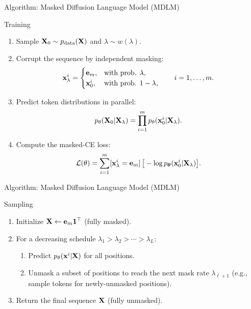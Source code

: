 \documentclass{beamer}
\begin{document}
\begin{frame}{Algorithm: Masked Diffusion Language Model (MDLM)}

	\begin{block}{Training}
		\begin{enumerate}
			\item Sample $\mathbf{X}_0 \sim p_{\text{data}}(\mathbf{X})$ and $\lambda \sim w(\lambda)$.
			\item Corrupt the sequence by independent masking:
			\[
				\mathbf{x}_\lambda^i =
				\begin{cases}
					\mathbf e_m, & \text{with prob. }\lambda,\\
					\mathbf{x}_0^i, & \text{with prob. }1-\lambda,
				\end{cases}
				\qquad i=1,\dots,m.
			\]
			\item Predict token distributions in parallel:
			\vspace{-0.3cm}
			\[
				p_\theta(\mathbf{X}_0 | \mathbf{X}_\lambda)
				=
				\prod_{i=1}^m p_\theta(\mathbf{x}_0^i | \mathbf{X}_\lambda).
			\]
			\vspace{-0.5cm}
			\item Compute the masked-CE loss:
			\vspace{-0.3cm}
			\[
				\mathcal{L}(\theta)
				=
				\sum_{i=1}^m [\mathbf{x}_\lambda^i=\mathbf e_m]\,
				\big[-\log p_{\boldsymbol{\theta}}(\mathbf{x}_0^i | \mathbf{X}_\lambda)\big].
			\]
		\end{enumerate}
	\end{block}

\end{frame}
\begin{frame}{Algorithm: Masked Diffusion Language Model (MDLM)}
	\begin{block}{Sampling}
		\begin{enumerate}
			\item Initialize $\mathbf{X} \leftarrow \mathbf e_m \mathbf 1^\top$ (fully masked).
			\item For a decreasing schedule $\lambda_1 > \lambda_2 > \cdots > \lambda_L$:
			\begin{enumerate}
				\item Predict $p_\theta(\mathbf{x}^i | \mathbf{X})$ for all positions.
				\item Unmask a subset of positions to reach the next mask rate $\lambda_{\ell+1}$
				(e.g., sample tokens for newly-unmasked positions).
			\end{enumerate}
			\item Return the final sequence $\mathbf{X}$ (fully unmasked).
		\end{enumerate}
	\end{block}
\end{frame}
\end{document}
